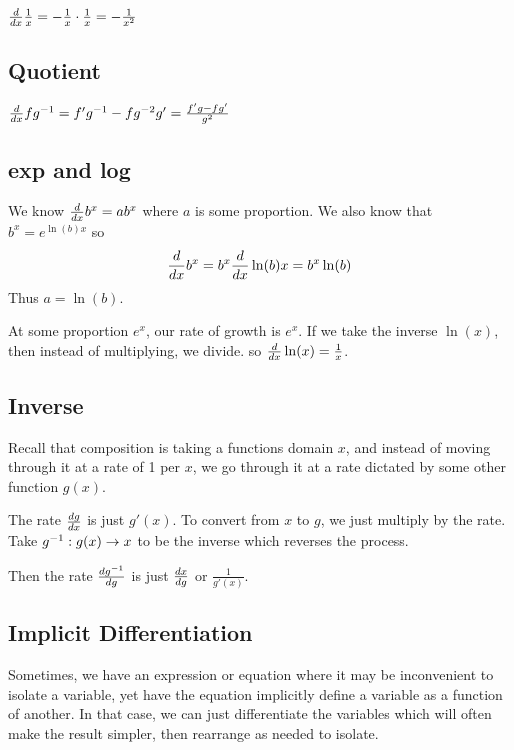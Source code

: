 \documentclass[../main.tex]{subfiles}
\begin{document}
\( \dv{x} \frac{1}{x} = - \frac{1}{x} \cdot \frac{1}{x} = - \frac{1}{x^2} \)




\subsection{Quotient}

\( \dv{x} fg^{-1} = f'g^{-1} - fg^{-2}g' = \frac{f'g - fg'}{g^2} \)

\subsection{exp and log}

We know \( \dv{x} b^x = ab^x \) where \( a \) is some proportion.
We also know that \( b^x = e^{\ln(b) x} \) so
\[ \dv{x} b^x = b^x \dv{x} \ln(b) x = b^x \ln(b) \]
Thus \( a = \ln(b) \).

At some proportion \( e^x \), our rate of growth is \( e^x \).
If we take the inverse \( \ln(x) \), then instead of multiplying, we divide.
so \( \dv{x} \ln(x) = \frac{1}{x} \).

\subsection{Inverse}

Recall that composition is taking a functions domain \( x \),
and instead of moving through it at a rate of 1 per \( x \),
we go through it at a rate dictated by some other function \( g(x) \).

\noindent


The rate \( \dv{g}{x} \) is just \( g'(x) \).
To convert from \( x \) to \( g \), we just multiply by the rate.
Take \( g^{-1}: g(x) \to x \) to be the inverse which reverses the process.

\noindent


Then the rate \( \dv{g^{-1}}{g} \) is just \( \dv{x}{g} \) or \( \frac{1}{g'(x)} \).


\subsection{Implicit Differentiation}

Sometimes, we have an expression or equation where it may be inconvenient to isolate
a variable, yet have the equation implicitly define a variable as a function of another.
In that case, we can just differentiate the variables which will often make the result simpler,
then rearrange as needed to isolate.
\end{document}
